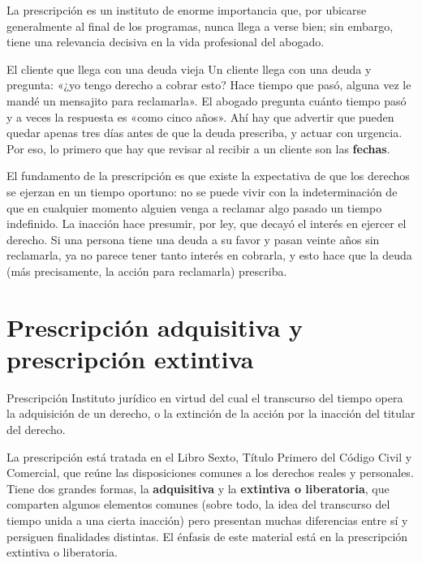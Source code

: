 \documentclass[12pt,oneside]{book}
\begin{document}
La prescripción es un instituto de enorme importancia que, por ubicarse generalmente al final de los programas, nunca llega a verse bien; sin embargo, tiene una relevancia decisiva en la vida profesional del abogado.

\begin{example}{El cliente que llega con una deuda vieja}
Un cliente llega con una deuda y pregunta: «¿yo tengo derecho a cobrar esto? Hace tiempo que pasó, alguna vez le mandé un mensajito para reclamarla». El abogado pregunta cuánto tiempo pasó y a veces la respuesta es «como cinco años». Ahí hay que advertir que pueden quedar apenas tres días antes de que la deuda prescriba, y actuar con urgencia. Por eso, lo primero que hay que revisar al recibir a un cliente son las \textbf{fechas}.
\end{example}

El fundamento de la prescripción es que existe la expectativa de que los derechos se ejerzan en un tiempo oportuno: no se puede vivir con la indeterminación de que en cualquier momento alguien venga a reclamar algo pasado un tiempo indefinido. La inacción hace presumir, por ley, que decayó el interés en ejercer el derecho. Si una persona tiene una deuda a su favor y pasan veinte años sin reclamarla, ya no parece tener tanto interés en cobrarla, y esto hace que la deuda (más precisamente, la acción para reclamarla) prescriba.

\section{Prescripción adquisitiva y prescripción extintiva}

\begin{definition}{Prescripción}
Instituto jurídico en virtud del cual el transcurso del tiempo opera la adquisición de un derecho, o la extinción de la acción por la inacción del titular del derecho.
\end{definition}

La prescripción está tratada en el Libro Sexto, Título Primero del Código Civil y Comercial, que reúne las disposiciones comunes a los derechos reales y personales. Tiene dos grandes formas, la \textbf{adquisitiva} y la \textbf{extintiva o liberatoria}, que comparten algunos elementos comunes (sobre todo, la idea del transcurso del tiempo unida a una cierta inacción) pero presentan muchas diferencias entre sí y persiguen finalidades distintas. El énfasis de este material está en la prescripción extintiva o liberatoria.
\end{document}
